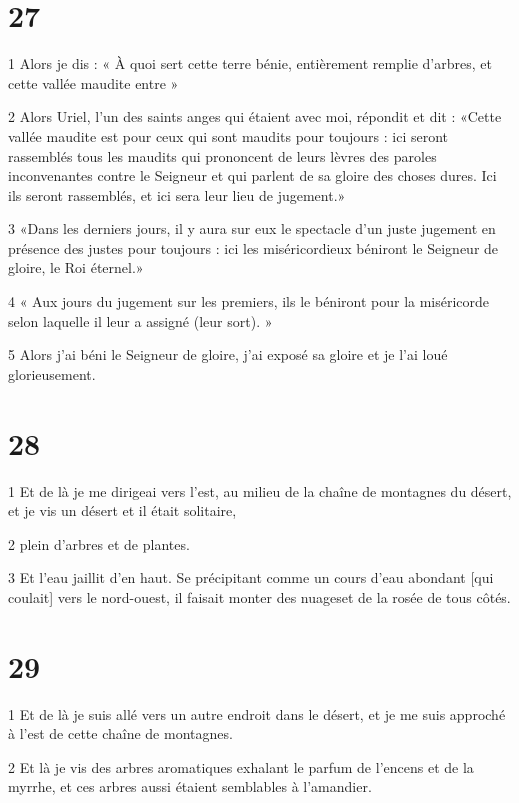 \chapter{27}

\par 1 Alors je dis : « À quoi sert cette terre bénie, entièrement remplie d’arbres, et cette vallée maudite entre »
\par 2 Alors Uriel, l'un des saints anges qui étaient avec moi, répondit et dit : «Cette vallée maudite est pour ceux qui sont maudits pour toujours : ici seront rassemblés tous les maudits qui prononcent de leurs lèvres des paroles inconvenantes contre le Seigneur et qui parlent de sa gloire des choses dures. Ici ils seront rassemblés, et ici sera leur lieu de jugement.»
\par 3 «Dans les derniers jours, il y aura sur eux le spectacle d'un juste jugement en présence des justes pour toujours : ici les miséricordieux béniront le Seigneur de gloire, le Roi éternel.»
\par 4 « Aux jours du jugement sur les premiers, ils le béniront pour la miséricorde selon laquelle il leur a assigné (leur sort). »
\par 5 Alors j'ai béni le Seigneur de gloire, j'ai exposé sa gloire et je l'ai loué glorieusement.

\chapter{28}

\par 1 Et de là je me dirigeai vers l'est, au milieu de la chaîne de montagnes du désert, et je vis un désert et il était solitaire,
\par 2 plein d'arbres et de plantes.
\par 3 Et l'eau jaillit d'en haut. Se précipitant comme un cours d'eau abondant [qui coulait] vers le nord-ouest, il faisait monter des nuages ​​et de la rosée de tous côtés.

\chapter{29}

\par 1 Et de là je suis allé vers un autre endroit dans le désert, et je me suis approché à l'est de cette chaîne de montagnes.
\par 2 Et là je vis des arbres aromatiques exhalant le parfum de l'encens et de la myrrhe, et ces arbres aussi étaient semblables à l'amandier.

